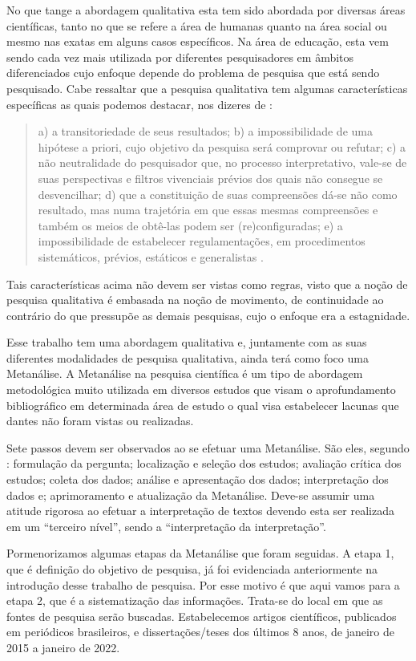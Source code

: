 \documentclass[portuguese]{textolivre}
\begin{document}
No que tange a abordagem qualitativa esta tem sido abordada por diversas
áreas científicas, tanto no que se refere a área de humanas quanto na
área social ou mesmo nas exatas em alguns casos específicos. Na área de
educação, esta vem sendo cada vez mais utilizada por diferentes
pesquisadores em âmbitos diferenciados cujo enfoque depende do problema
de pesquisa que está sendo pesquisado. Cabe ressaltar que a pesquisa
qualitativa tem algumas características específicas as quais podemos
destacar, nos dizeres de \textcite{garnica2003}:
\begin{quote}
a) a transitoriedade de seus resultados; b) a impossibilidade de uma
hipótese a priori, cujo objetivo da pesquisa será comprovar ou refutar;
c) a não neutralidade do pesquisador que, no processo interpretativo,
vale-se de suas perspectivas e filtros vivenciais prévios dos quais não
consegue se desvencilhar; d) que a constituição de suas compreensões
dá-se não como resultado, mas numa trajetória em que essas mesmas
compreensões e também os meios de obtê-las podem ser (re)configuradas;
e) a impossibilidade de estabelecer regulamentações, em procedimentos
sistemáticos, prévios, estáticos e generalistas
\cite[p.~86]{garnica2003}.
\end{quote}

Tais características acima não devem ser vistas como regras, visto que a
noção de pesquisa qualitativa é embasada na noção de movimento, de
continuidade ao contrário do que pressupõe as demais pesquisas, cujo o
enfoque era a estagnidade.

Esse trabalho tem uma abordagem qualitativa e, juntamente com as suas
diferentes modalidades de pesquisa qualitativa, ainda terá como foco uma
Metanálise. A Metanálise na pesquisa científica é um tipo de abordagem
metodológica muito utilizada em diversos estudos que visam o
aprofundamento bibliográfico em determinada área de estudo o qual visa
estabelecer lacunas que dantes não foram vistas ou realizadas.

Sete passos devem ser observados ao se efetuar uma Metanálise. São eles,
segundo \textcite[p.~13]{bicudo2014}: formulação da pergunta; localização e
seleção dos estudos; avaliação crítica dos estudos; coleta dos dados;
análise e apresentação dos dados; interpretação dos dados e;
aprimoramento e atualização da Metanálise. Deve-se assumir uma atitude
rigorosa ao efetuar a interpretação de textos devendo esta ser realizada
em um ``terceiro nível'', sendo a ``interpretação da interpretação''.

Pormenorizamos algumas etapas da Metanálise que foram seguidas. A etapa
1, que é definição do objetivo de pesquisa, já foi evidenciada
anteriormente na introdução desse trabalho de pesquisa. Por esse motivo
é que aqui vamos para a etapa 2, que é a sistematização das informações.
Trata-se do local em que as fontes de pesquisa serão buscadas.
Estabelecemos artigos científicos, publicados em periódicos brasileiros,
e dissertações/teses dos últimos 8 anos, de janeiro de 2015 a janeiro de
2022.
\end{document}
